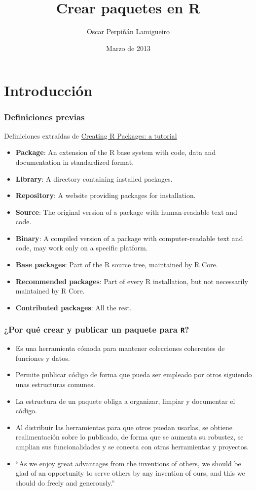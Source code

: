 \documentclass[xcolor={usenames,svgnames,dvipsnames}]{beamer}
\title{Crear paquetes en R}
\author{Oscar Perpiñán Lamigueiro}
\date{Marzo de 2013}
\begin{document}
\maketitle


\section{Introducción}
\label{sec-1}
\begin{frame}
\frametitle{Definiciones previas}
\label{sec-1-1}


Definiciones extraídas de \href{http://cran.r-project.org/doc/contrib/Leisch-CreatingPackages.pdf}{Creating R Packages: a tutorial}
\begin{itemize}
\item \textbf{Package}: An extension of the R base system with code, data and
  documentation in standardized format.
\item \textbf{Library}: A directory containing installed packages.
\item \textbf{Repository}: A website providing packages for installation.
\item \textbf{Source}: The original version of a package with human-readable text and code.
\item \textbf{Binary}: A compiled version of a package with computer-readable
  text and code, may work only on a specific platform.
\item \textbf{Base packages}: Part of the R source tree, maintained by R Core.
\item \textbf{Recommended packages}: Part of every R installation, but not
  necessarily maintained by R Core.
\item \textbf{Contributed packages}: All the rest.
\end{itemize}
\end{frame}
\begin{frame}
\frametitle{¿Por qué crear y publicar un paquete para \texttt{R}?}
\label{sec-1-2}


\begin{itemize}
\item Es una herramienta cómoda para mantener colecciones coherentes de funciones
  y datos.
\item Permite publicar código de forma que pueda ser empleado por
  otros siguiendo unas estructuras comunes.
\item La estructura de un paquete obliga a organizar, limpiar y
  documentar el código.
\item Al distribuir las herramientas para que otros puedan usarlas, se
  obtiene realimentación sobre lo publicado, de forma que se
  aumenta su robustez, se amplian sus funcionalidades y se conecta
  con otras herramientas y proyectos.
\item ``As we enjoy great advantages from the inventions of others, we
  should be glad of an opportunity to serve others by any
  invention of ours, and this we should do freely and generously.''
\end{itemize}
\end{frame}
\end{document}
